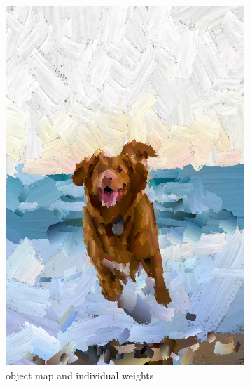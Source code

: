 \documentclass[11pt]{article}
\begin{document}
\begin{figure}[ht]
\begin{subfigure}[b]{0.24\textwidth}
         \includegraphics[width=\textwidth]{final-singular.png}
         \caption{object map and individual weights}
         \label{fig:fs}
     \end{subfigure}
     \hfill
     \begin{subfigure}[b]{0.24\textwidth}
         \centering

\end{subfigure}
\end{figure}
\end{document}
